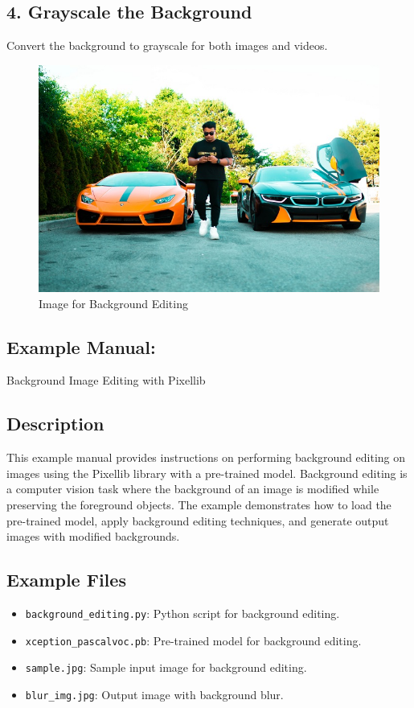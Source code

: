 \subsection*{4. Grayscale the Background}
Convert the background to grayscale for both images and videos.

\begin{figure}[h!]
    \centering
    \includegraphics[width=0.8\linewidth]{Images/PixelLib/image5.jpeg} %
    
    \caption{Image for Background Editing}
    \label{fig:your_image_label}
\end{figure}

\subsection{Example Manual:}
Background  Image Editing with Pixellib


\subsection{Description}
This example manual provides instructions on performing background editing on images using the Pixellib library with a pre-trained model. Background editing is a computer vision task where the background of an image is modified while preserving the foreground objects. The example demonstrates how to load the pre-trained model, apply background editing techniques, and generate output images with modified backgrounds.

\subsection{Example Files}
\begin{itemize}
    \item \texttt{background\_editing.py}: Python script for background editing.
    \item \texttt{xception\_pascalvoc.pb}: Pre-trained model for background editing.
    \item \texttt{sample.jpg}: Sample input image for background editing.
    \item \texttt{blur\_img.jpg}: Output image with background blur.
\end{itemize}

